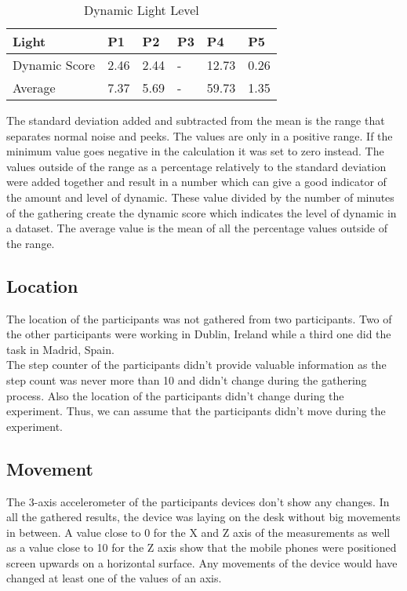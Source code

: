 \begin{table}[ht]
  \begin{tabular}{|P{3cm}|P{1.6cm}|P{1.6cm}|P{1.6cm}|P{1.6cm}|P{1.6cm}|}
   	\textbf{Light}				& \textbf{P1}			& \textbf{P2}			& 	\textbf{P3}		& 	\textbf{P4}			& 	\textbf{P5}	\\ \hline
  	Dynamic Score				& 2.46						& 2.44						& 	-						& 12.73					& 0.26				\\ \hline
  	Average 						& 7.37						& 5.69						& 	-						& 59.73					& 1.35				\\ \hline
  	\end{tabular}
  	\newline\newline
  	\caption{Dynamic Light Level}\label{dynLight}
\end{table}

The standard deviation added and subtracted from the mean is the range that separates normal noise and peeks. The values are only in a positive range. If the minimum value goes negative in the calculation it was set to zero instead. 
The values outside of the range as a percentage relatively to the standard deviation were added together and result in a number which can give a good indicator of the amount and level of dynamic. 
These value divided by the number of minutes of the gathering create the dynamic score which indicates the level of dynamic in a dataset.
The average value is the mean of all the percentage values outside of the range.

\FloatBarrier

\subsection{Location}
The location of the participants was not gathered from two participants. Two of the other participants were working in Dublin, Ireland while a third one did the task in Madrid, Spain.\\
The step counter of the participants didn't provide valuable information as the step count was never more than 10 and didn't change during the gathering process. Also the location of the participants didn't change during the experiment. Thus, we can assume that the participants didn't move during the experiment.

\subsection{Movement}
The 3-axis accelerometer of the participants devices don't show any changes. In all the gathered results, the device was laying on the desk without big movements in between. A value close to 0 for the X and Z axis of the measurements as well as a value close to 10 for the Z axis show that the mobile phones were positioned screen upwards on a horizontal surface. Any movements of the device would have changed at least one of the values of an axis. 

